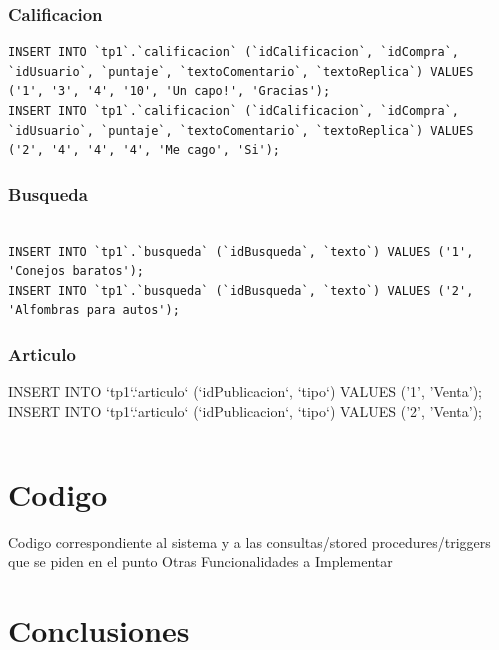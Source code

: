 \documentclass[a4paper, 10pt, twoside]{article}
\begin{document}
\subsubsection{Calificacion}
\begin{verbatim}
INSERT INTO `tp1`.`calificacion` (`idCalificacion`, `idCompra`, `idUsuario`, `puntaje`, `textoComentario`, `textoReplica`) VALUES ('1', '3', '4', '10', 'Un capo!', 'Gracias');
INSERT INTO `tp1`.`calificacion` (`idCalificacion`, `idCompra`, `idUsuario`, `puntaje`, `textoComentario`, `textoReplica`) VALUES ('2', '4', '4', '4', 'Me cago', 'Si');

\end{verbatim}

\subsubsection{Busqueda}
\begin{verbatim}

INSERT INTO `tp1`.`busqueda` (`idBusqueda`, `texto`) VALUES ('1', 'Conejos baratos');
INSERT INTO `tp1`.`busqueda` (`idBusqueda`, `texto`) VALUES ('2', 'Alfombras para autos');
\end{verbatim}

\subsubsection{Articulo}

INSERT INTO `tp1`.`articulo` (`idPublicacion`, `tipo`) VALUES ('1', 'Venta');
INSERT INTO `tp1`.`articulo` (`idPublicacion`, `tipo`) VALUES ('2', 'Venta');
\begin{verbatim}

\end{verbatim}








\section{Codigo}
 Codigo correspondiente al sistema y a las consultas/stored procedures/triggers que se
piden en el punto Otras Funcionalidades a Implementar
\section{Conclusiones}
\end{document}
